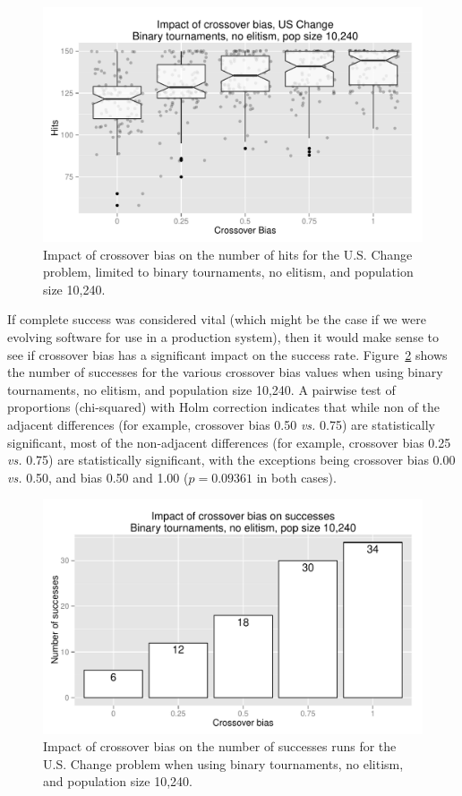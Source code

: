 \documentclass{sig-alternate}
\begin{document}
\begin{figure}
\centering
\includegraphics[width=0.45 \textwidth]{Plots/US_change_hits_strong.pdf}
\caption{Impact of crossover bias on the number of hits for the U.S. Change problem, limited to binary 
tournaments, no elitism, and population size 10,240.}
\label{fig:USChange_Hits_strong}
\end{figure}

%
%
%
%

If complete success was considered vital (which might be the case if we were evolving software for use in a production
system), then it would make sense to see if crossover bias has a significant impact on the success rate.
Figure~\ref{fig:USChange_Successes_strong} shows the number of successes for the various crossover bias values when
using binary tournaments, no elitism, and population size 10,240. A pairwise test of proportions (chi-squared) with
Holm correction indicates that while non of the adjacent differences (for example, crossover bias 0.50 \emph{vs.} 0.75)
are statistically significant, most of the non-adjacent differences (for example, crossover bias 0.25 \emph{vs.} 0.75)
are statistically significant, with the exceptions being crossover bias 0.00 \emph{vs.} 0.50, and bias 0.50 and 1.00
($p=0.09361$ in both cases).

\begin{figure}
\centering
\includegraphics[width=0.45 \textwidth]{Plots/US_change_successes_strong.pdf}
\caption{Impact of crossover bias on the number of successes runs for the U.S. Change problem when using binary
tournaments, no elitism, and population size 10,240.}
\label{fig:USChange_Successes_strong}
\end{figure}
\end{document}
